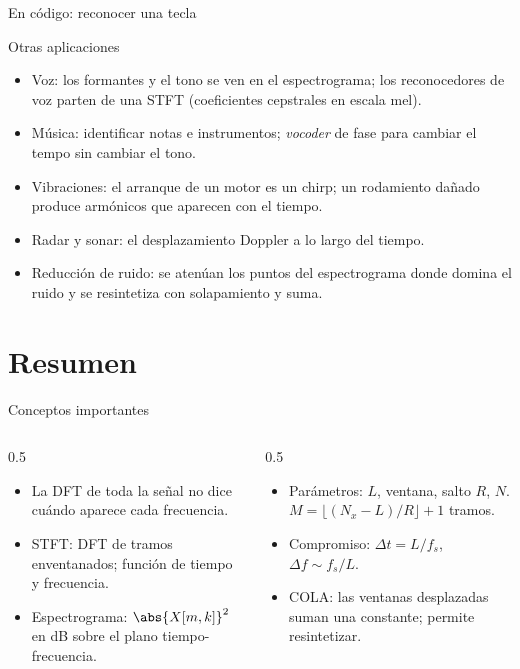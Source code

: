 \documentclass[aspectratio=169,11pt]{beamer}
\begin{document}
\begin{frame}{En código: reconocer una tecla}
\end{frame}

\begin{frame}{Otras aplicaciones}
  \begin{itemize}
    \item \alert{Voz}: los formantes y el tono se ven en el espectrograma; los reconocedores de voz parten de una STFT (coeficientes cepstrales en escala mel).
    \item \alert{Música}: identificar notas e instrumentos; \emph{vocoder} de fase para cambiar el tempo sin cambiar el tono.
    \item \alert{Vibraciones}: el arranque de un motor es un chirp; un rodamiento dañado produce armónicos que aparecen con el tiempo.
    \item \alert{Radar y sonar}: el desplazamiento Doppler a lo largo del tiempo.
    \item \alert{Reducción de ruido}: se atenúan los puntos del espectrograma donde domina el ruido y se resintetiza con solapamiento y suma.
  \end{itemize}
\end{frame}

\section*{Resumen}
\begin{frame}{Conceptos importantes}
  \begin{columns}[T]
    \begin{column}{0.5\textwidth}
      \begin{itemize}
        \item La DFT de toda la señal no dice cuándo aparece cada frecuencia.
        \item STFT: DFT de tramos enventanados; función de tiempo y frecuencia.
        \item Espectrograma: $\abs{X[m,k]}^2$ en dB sobre el plano tiempo-frecuencia.
      \end{itemize}
    \end{column}
    \begin{column}{0.5\textwidth}
      \begin{itemize}
        \item Parámetros: $L$, ventana, salto $R$, $N$. $M=\lfloor(N_x-L)/R\rfloor+1$ tramos.
        \item Compromiso: $\Delta t=L/f_s$, $\Delta f\sim f_s/L$.
        \item COLA: las ventanas desplazadas suman una constante; permite resintetizar.
      \end{itemize}
    \end{column}
  \end{columns}
  \bigskip
\end{frame}
\end{document}
